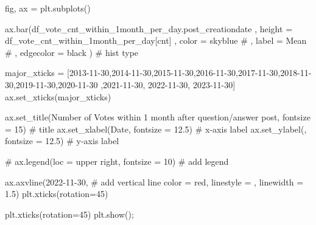 \documentclass[
  letterpaper,
  DIV=11,
  numbers=noendperiod]{scrartcl}
\newenvironment{Shaded}{\begin{snugshade}}{\end{snugshade}}
\newcommand{\CommentTok}[1]{\textcolor[rgb]{0.37,0.37,0.37}{#1}}
\newcommand{\DecValTok}[1]{\textcolor[rgb]{0.68,0.00,0.00}{#1}}
\newcommand{\FloatTok}[1]{\textcolor[rgb]{0.68,0.00,0.00}{#1}}
\newcommand{\NormalTok}[1]{\textcolor[rgb]{0.00,0.23,0.31}{#1}}
\newcommand{\OperatorTok}[1]{\textcolor[rgb]{0.37,0.37,0.37}{#1}}
\newcommand{\StringTok}[1]{\textcolor[rgb]{0.13,0.47,0.30}{#1}}
\begin{document}
\begin{Shaded}
\begin{Highlighting}[]
\NormalTok{fig, ax }\OperatorTok{=}\NormalTok{ plt.subplots()}


\NormalTok{ax.bar(df\_vote\_cnt\_within\_1month\_per\_day.post\_creationdate}
\NormalTok{    ,  height }\OperatorTok{=}\NormalTok{ df\_vote\_cnt\_within\_1month\_per\_day[}\StringTok{\textquotesingle{}cnt\textquotesingle{}}\NormalTok{]}
\NormalTok{    ,  color }\OperatorTok{=} \StringTok{\textquotesingle{}skyblue\textquotesingle{}}
    \CommentTok{\# ,  label = \textquotesingle{}Mean\textquotesingle{}}
    \CommentTok{\# ,  edgecolor = \textquotesingle{}black\textquotesingle{}}
\NormalTok{      ) }\CommentTok{\# hist type}


\NormalTok{major\_xticks }\OperatorTok{=}\NormalTok{ [}\StringTok{\textquotesingle{}2013{-}11{-}30\textquotesingle{}}\NormalTok{,}\StringTok{\textquotesingle{}2014{-}11{-}30\textquotesingle{}}\NormalTok{,}\StringTok{\textquotesingle{}2015{-}11{-}30\textquotesingle{}}\NormalTok{,}\StringTok{\textquotesingle{}2016{-}11{-}30\textquotesingle{}}\NormalTok{,}\StringTok{\textquotesingle{}2017{-}11{-}30\textquotesingle{}}\NormalTok{,}\StringTok{\textquotesingle{}2018{-}11{-}30\textquotesingle{}}\NormalTok{,}\StringTok{\textquotesingle{}2019{-}11{-}30\textquotesingle{}}\NormalTok{,}\StringTok{\textquotesingle{}2020{-}11{-}30\textquotesingle{}}
\NormalTok{                ,}\StringTok{\textquotesingle{}2021{-}11{-}30\textquotesingle{}}\NormalTok{, }\StringTok{\textquotesingle{}2022{-}11{-}30\textquotesingle{}}\NormalTok{, }\StringTok{\textquotesingle{}2023{-}11{-}30\textquotesingle{}}\NormalTok{]}
\NormalTok{ax.set\_xticks(major\_xticks)}

\NormalTok{ax.set\_title(}\StringTok{\textquotesingle{}Number of Votes within 1 month after question/answer post\textquotesingle{}}\NormalTok{, fontsize }\OperatorTok{=} \DecValTok{15}\NormalTok{) }\CommentTok{\# title}
\NormalTok{ax.set\_xlabel(}\StringTok{\textquotesingle{}Date\textquotesingle{}}\NormalTok{, fontsize }\OperatorTok{=} \FloatTok{12.5}\NormalTok{) }\CommentTok{\# x{-}axis label}
\NormalTok{ax.set\_ylabel(}\StringTok{\textquotesingle{}\textquotesingle{}}\NormalTok{, fontsize }\OperatorTok{=} \FloatTok{12.5}\NormalTok{) }\CommentTok{\# y{-}axis label}

\CommentTok{\# ax.legend(loc = \textquotesingle{}upper right\textquotesingle{}, fontsize = 10) \# add legend}

\NormalTok{ax.axvline(}\StringTok{\textquotesingle{}2022{-}11{-}30\textquotesingle{}}\NormalTok{, }\CommentTok{\# add vertical line}
\NormalTok{           color }\OperatorTok{=} \StringTok{\textquotesingle{}red\textquotesingle{}}\NormalTok{,}
\NormalTok{           linestyle }\OperatorTok{=} \StringTok{\textquotesingle{}{-}{-}\textquotesingle{}}\NormalTok{,}
\NormalTok{           linewidth }\OperatorTok{=} \FloatTok{1.5}\NormalTok{)}
\NormalTok{plt.xticks(rotation}\OperatorTok{=}\DecValTok{45}\NormalTok{)}

\NormalTok{plt.xticks(rotation}\OperatorTok{=}\DecValTok{45}\NormalTok{)}
\NormalTok{plt.show()}\OperatorTok{;}
\end{Highlighting}
\end{Shaded}
\end{document}
